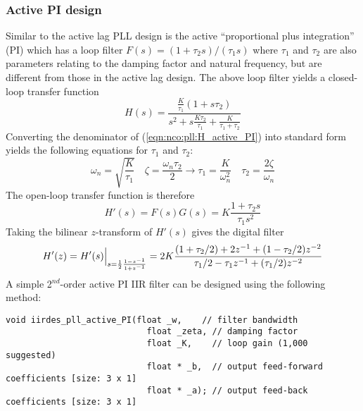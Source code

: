 \subsubsection{Active PI design}
\label{module:nco:pll:active_PI}
Similar to the active lag PLL design is the
active ``proportional plus integration'' (PI)
which has a loop filter
$F(s) = (1 + \tau_2 s)/(\tau_1 s)$
where $\tau_1$ and $\tau_2$ are also parameters relating to the damping
factor and natural frequency,
but are different from those in the active lag design.
The above loop filter yields a closed-loop transfer function
%
\begin{equation}
\label{eqn:nco:pll:H_active_PI}
    H(s) = \frac{
                \frac{K}{\tau_1} (1 + s\tau_2)
           } {
                s^2 + s\frac{K\tau_2}{\tau_1} + \frac{K}{\tau_1 + \tau_2}
           }
\end{equation}
%
Converting the denominator of (\ref{eqn:nco:pll:H_active_PI}) into
standard form yields the following equations for $\tau_1$ and $\tau_2$:
%
\begin{equation}
    \omega_n = \sqrt{\frac{K}{\tau_1}}
    \,\,\,\,\,\,
    \zeta = \frac{\omega_n \tau_2}{2}
        \rightarrow
    \tau_1 = \frac{K}{\omega_n^2}
    \,\,\,\,\,\,
    \tau_2 = \frac{2\zeta}{\omega_n}
\end{equation}
%
The open-loop transfer function is therefore
%
\begin{equation}
    H'(s) = F(s)G(s) = K \frac{1 + \tau_2 s}{\tau_1 s^2}
\end{equation}
%
Taking the bilinear $z$-transform of $H'(s)$ gives the digital filter
%
\begin{equation}
    H'(z) = H'(s)\Bigl.\Bigr|_{s = \frac{1}{2}\frac{1-z^{-1}}{1+z^{-1}}}
          = 2 K \frac{
                (1+\tau_2/2) + 2 z^{-1}     + ( 1 - \tau_2/2)z^{-2}
          } {
                \tau_1/2 -\tau_1 z^{-1} + (\tau_1/2)z^{-2}
          }
\end{equation}
%
A simple 2$^{nd}$-order active PI IIR filter can be designed using the
following method:
%
\begin{Verbatim}[fontsize=\small]
  void iirdes_pll_active_PI(float _w,    // filter bandwidth
                            float _zeta, // damping factor
                            float _K,    // loop gain (1,000 suggested)
                            float * _b,  // output feed-forward coefficients [size: 3 x 1]
                            float * _a); // output feed-back coefficients [size: 3 x 1]
\end{Verbatim}
%



